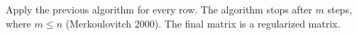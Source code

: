 \documentclass[a4paper,12pt,final]{article}
\begin{document}
Apply the previous algorithm for every row. The algorithm stops after $m$ 
steps, where $m \le n$ (Merkoulovitch 2000). The final matrix is a regularized
matrix. 

\newpage


\end{document}
